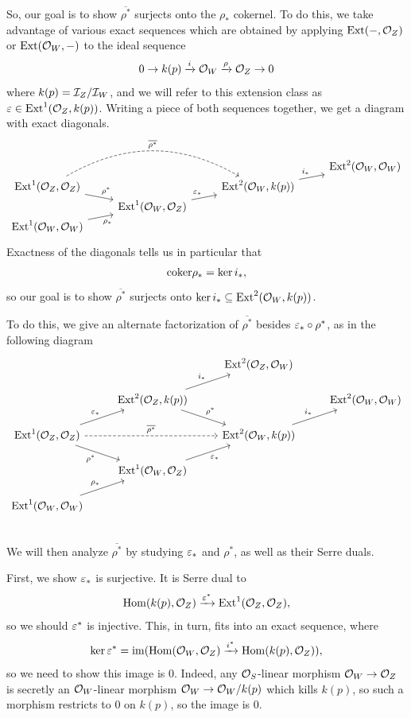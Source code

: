 \documentclass[12pt]{article}
\begin{document}
So, our goal is to show $\overline{\rho^*}$ surjects onto the $\rho_*$ cokernel. To do this, we take advantage of various exact sequences which are obtained by applying $\mathrm{Ext}(-,\mathcal{O}_Z)$ or $\mathrm{Ext}(\mathcal{O}_W,-)$ to the ideal sequence
\[0\to k(p) \xrightarrow{i} \mathcal{O}_W \xrightarrow{\rho} \mathcal{O}_Z \to 0\]
where $k(p) = \mathcal{I}_Z/\mathcal{I}_W$, and we will refer to this extension class as $\varepsilon \in \mathrm{Ext}^1(\mathcal{O}_Z,k(p))$. Writing a piece of both sequences together, we get a diagram with exact diagonals.
\[\begin{tikzcd}[row sep=0]
    &&& \Ext^2(\cO_W,\cO_W)\\
    \Ext^1(\cO_Z,\cO_Z) \ar[dr,"\rho^*"] \ar[rr,bend left,dashed,"\overline{\rho^*}"] & & \Ext^2(\cO_W,k(p)) \ar[ur,"i_*"] &\\
    & \Ext^1(\cO_W,\cO_Z) \ar[ur,"\eps_*"] & &\\
    \Ext^1(\cO_W,\cO_W) \ar[ur,"\rho_*"'] & & &\\
\end{tikzcd}\]
Exactness of the diagonals tells us in particular that
\[\mathrm{coker} \rho_* = \ker i_*,\]
so our goal is to show $\overline{\rho^*}$ surjects onto $\ker i_* \subseteq \mathrm{Ext}^2(\mathcal{O}_W,k(p))$.

To do this, we give an alternate factorization of $\overline{\rho^*}$ besides $\varepsilon_* \circ \rho^*$, as in the following diagram
\[\begin{tikzcd}[row sep=0.5cm]
    && \Ext^2(\cO_Z,\cO_W) &\\
    & \Ext^2(\cO_Z,k(p)) \ar[dr,"\rho^*"] \ar[ur,"i_*"] && \Ext^2(\cO_W,\cO_W)\\
    \Ext^1(\cO_Z,\cO_Z) \ar[rr,dashed,"\overline{\rho^*}"] \ar[ur,"\eps_*"] \ar[dr,"\rho^*"'] & & \Ext^2(\cO_W,k(p)) \ar[ur,"i_*"] &\\
    & \Ext^1(\cO_W,\cO_Z) \ar[ur,"\eps_*"'] & & \\
    \Ext^1(\cO_W,\cO_W) \ar[ur,"\rho_*"] & & &\\
\end{tikzcd}\]

We will then analyze $\overline{\rho^*}$ by studying $\varepsilon_*$ and $\rho^*$, as well as their Serre duals.

First, we show $\varepsilon_*$ is surjective. It is Serre dual to
\[\mathrm{Hom}(k(p),\mathcal{O}_Z) \xrightarrow{\varepsilon^*} \mathrm{Ext}^1(\mathcal{O}_Z,\mathcal{O}_Z),\]
so we should $\varepsilon^*$ is injective. This, in turn, fits into an exact sequence, where
\[\ker \varepsilon^* = \mathrm{im}(\mathrm{Hom}(\mathcal{O}_W,\mathcal{O}_Z) \xrightarrow{i^*} \mathrm{Hom}(k(p),\mathcal{O}_Z)),\]
so we need to show this image is 0. Indeed, any $\mathcal{O}_S$-linear morphism $\mathcal{O}_W\to \mathcal{O}_Z$ is secretly an $\mathcal{O}_W$-linear morphism $\mathcal{O}_W \to \mathcal{O}_W/k(p)$ which kills $k(p)$, so such a morphism restricts to 0 on $k(p)$, so the image is 0.
\end{document}
